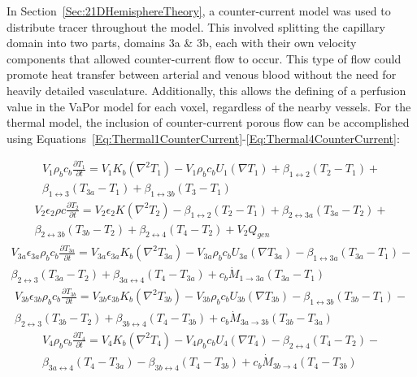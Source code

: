 \documentclass[11pt,english,a4paper,twoside,openright]{report}
\begin{document}
{{{{{{{In Section~\ref{Sec:21DHemisphereTheory}, a counter-current model was used to distribute tracer throughout the model. This involved splitting the capillary domain into two parts, domains 3a \& 3b, each with their own velocity components that allowed counter-current flow to occur. This type of flow could promote heat transfer between arterial and venous blood without the need for heavily detailed vasculature. Additionally, this allows the defining of a perfusion value in the VaPor model for each voxel, regardless of the nearby vessels. For the thermal model, the inclusion of counter-current porous flow can be accomplished using Equations~\ref{Eq:Thermal1CounterCurrent}-\ref{Eq:Thermal4CounterCurrent}:

\begin{multline}
\label{Eq:Thermal1CounterCurrent}
V_{1}\rho_{b}c_{b}\frac{\partial T_{1}}{\partial t}=V_{1}K_{b}(\nabla^{2}T_{1})-V_{1}\rho_{b}c_{b}U_{1}(\nabla T_{1})+\beta_{1\leftrightarrow2}(T_{2}-T_{1})+\\ \beta_{1\leftrightarrow3}(T_{3a}-T_{1})+\beta_{1\leftrightarrow3b}(T_{3}-T_{1})
\end{multline}
\begin{multline}
\label{Eq:Thermal2CounterCurrent}
V_{2}\epsilon_{2}\rho c\frac{\partial T_{2}}{\partial t}=V_{2}\epsilon_{2} K(\nabla^{2}T_{2})-\beta_{1\leftrightarrow2}(T_{2}-T_{1})+\beta_{2\leftrightarrow3a}(T_{3a}-T_{2})+\\
\beta_{2\leftrightarrow3b}(T_{3b}-T_{2})+\beta_{2\leftrightarrow4}(T_{4}-T_{2})+V_{2}Q_{gen}
\end{multline}
\begin{multline}
\label{Eq:Thermal3CounterCurrent}
V_{3a}\epsilon_{3a}\rho_{b}c_{b}\frac{\partial T_{3a}}{\partial t}=V_{3a}\epsilon_{3a}K_{b}(\nabla^{2}T_{3a})-V_{3a}\rho_{b}c_{b}U_{3a}(\nabla T_{3a})-\beta_{1\leftrightarrow3a}(T_{3a}-T_{1})-\\\beta_{2\leftrightarrow3}(T_{3a}-T_{2})
+\beta_{3a\leftrightarrow4}(T_{4}-T_{3a})+c_{b}\dot{M}_{1\rightarrow3a}(T_{3a}-T_{1})
\end{multline}
\begin{multline}
\label{Eq:Thermal3bCounterCurrent}
V_{3b}\epsilon_{3b}\rho_{b}c_{b}\frac{\partial T_{3b}}{\partial t}=V_{3b}\epsilon_{3b}K_{b}(\nabla^{2}T_{3b})-V_{3b}\rho_{b}c_{b}U_{3b}(\nabla T_{3b})-\beta_{1\leftrightarrow3b}(T_{3b}-T_{1})-\\\beta_{2\leftrightarrow3}(T_{3b}-T_{2})
+\beta_{3b\leftrightarrow4}(T_{4}-T_{3b})+c_{b}\dot{M}_{3a\rightarrow3b}(T_{3b}-T_{3a})
\end{multline}
\begin{multline}
\label{Eq:Thermal4CounterCurrent}
V_{4}\rho_{b}c_{b}\frac{\partial T_{4}}{\partial t}=V_{4}K_{b}(\nabla^{2}T_{4})-V_{4}\rho_{b}c_{b}U_{4}(\nabla T_{4})-\beta_{2\leftrightarrow4}(T_{4}-T_{2})-\\
\beta_{3a\leftrightarrow4}(T_{4}-T_{3a})-\beta_{3b\leftrightarrow4}(T_{4}-T_{3b})+c_{b}\dot{M}_{3b\rightarrow4}(T_{4}-T_{3b})
\end{multline}

}}}}}}}
\end{document}
